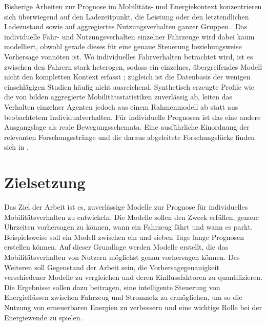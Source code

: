 Bisherige Arbeiten zur Prognose im Mobilitäts- und Energiekontext konzentrieren sich überwiegend auf den Ladezeitpunkt, die Leistung oder den letztendlichen Ladezustand sowie auf aggregiertes Nutzungsverhalten ganzer Gruppen \parencite{frendo2021improving,frendo2020datadriven,khwaja2021performance,kreft2024predictability,amaraouali2025quantifying}. Das individuelle Fahr- und Nutzungsverhalten einzelner Fahrzeuge wird dabei kaum modelliert, obwohl gerade dieses für eine genaue Steuerung beziehungsweise Vorhersage vonnöten ist. Wo individuelles Fahrverhalten betrachtet wird, ist es zwischen den Fahrern stark heterogen, sodass ein einzelnes, übergreifendes Modell nicht den kompletten Kontext erfasst \parencite{ji2023rethinking,song2010limits,lu2013approaching}; zugleich ist die Datenbasis der wenigen einschlägigen Studien häufig nicht ausreichend. Synthetisch erzeugte Profile wie die von \textcite{emobpy_nature} bilden aggregierte Mobilitätsstatistiken zuverlässig ab, leiten das Verhalten einzelner Agenten jedoch aus einem Rahmenmodell ab statt aus beobachtetem Individualverhalten. Für individuelle Prognosen ist das eine andere Ausgangslage als reale Bewegungsschemata. Eine ausführliche Einordnung der relevanten Forschungsstränge und die daraus abgeleitete Forschungslücke finden sich in .

\section{Zielsetzung}
\label{sec:zielsetzung}

Das Ziel der Arbeit ist es, zuverlässige Modelle zur Prognose für individuelles Mobilitätsverhalten zu entwickeln. Die Modelle sollen den Zweck erfüllen, genaue Uhrzeiten vorhersagen zu können, wann ein Fahrzeug fährt und wann es parkt. Beispielsweise soll ein Modell zwischen ein und sieben Tage lange Prognosen erstellen können. Auf dieser Grundlage werden Modelle erstellt, die das Mobilitätsverhalten von Nutzern möglichst genau vorhersagen können. Des Weiteren soll Gegenstand der Arbeit sein, die Vorhersagegenauigkeit verschiedener Modelle zu vergleichen und deren Einflussfaktoren zu quantifizieren. Die Ergebnisse sollen dazu beitragen, eine intelligente Steuerung von Energieflüssen zwischen Fahrzeug und Stromnetz zu ermöglichen, um so die Nutzung von erneuerbaren Energien zu verbessern und eine wichtige Rolle bei der Energiewende zu spielen.

